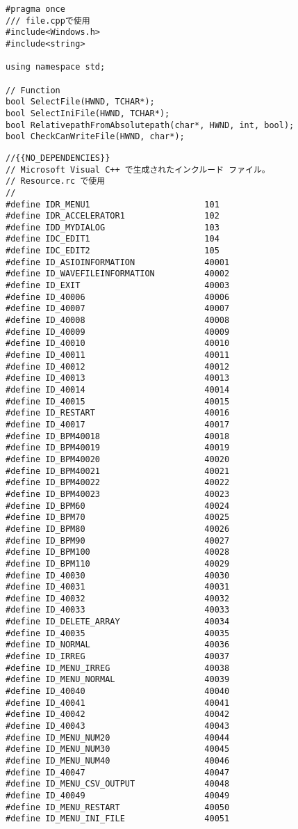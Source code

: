 \begin{lstlisting}[caption=file.h]
#pragma once
/// file.cppで使用
#include<Windows.h>
#include<string>

using namespace std;

// Function
bool SelectFile(HWND, TCHAR*);
bool SelectIniFile(HWND, TCHAR*);
bool RelativepathFromAbsolutepath(char*, HWND, int, bool);
bool CheckCanWriteFile(HWND, char*);
\end{lstlisting}

\begin{lstlisting}[caption=resource.h]
//{{NO_DEPENDENCIES}}
// Microsoft Visual C++ で生成されたインクルード ファイル。
// Resource.rc で使用
//
#define IDR_MENU1                       101
#define IDR_ACCELERATOR1                102
#define IDD_MYDIALOG                    103
#define IDC_EDIT1                       104
#define IDC_EDIT2                       105
#define ID_ASIOINFORMATION              40001
#define ID_WAVEFILEINFORMATION          40002
#define ID_EXIT                         40003
#define ID_40006                        40006
#define ID_40007                        40007
#define ID_40008                        40008
#define ID_40009                        40009
#define ID_40010                        40010
#define ID_40011                        40011
#define ID_40012                        40012
#define ID_40013                        40013
#define ID_40014                        40014
#define ID_40015                        40015
#define ID_RESTART                      40016
#define ID_40017                        40017
#define ID_BPM40018                     40018
#define ID_BPM40019                     40019
#define ID_BPM40020                     40020
#define ID_BPM40021                     40021
#define ID_BPM40022                     40022
#define ID_BPM40023                     40023
#define ID_BPM60                        40024
#define ID_BPM70                        40025
#define ID_BPM80                        40026
#define ID_BPM90                        40027
#define ID_BPM100                       40028
#define ID_BPM110                       40029
#define ID_40030                        40030
#define ID_40031                        40031
#define ID_40032                        40032
#define ID_40033                        40033
#define ID_DELETE_ARRAY                 40034
#define ID_40035                        40035
#define ID_NORMAL                       40036
#define ID_IRREG                        40037
#define ID_MENU_IRREG                   40038
#define ID_MENU_NORMAL                  40039
#define ID_40040                        40040
#define ID_40041                        40041
#define ID_40042                        40042
#define ID_40043                        40043
#define ID_MENU_NUM20                   40044
#define ID_MENU_NUM30                   40045
#define ID_MENU_NUM40                   40046
#define ID_40047                        40047
#define ID_MENU_CSV_OUTPUT              40048
#define ID_40049                        40049
#define ID_MENU_RESTART                 40050
#define ID_MENU_INI_FILE                40051


\end{lstlisting}
